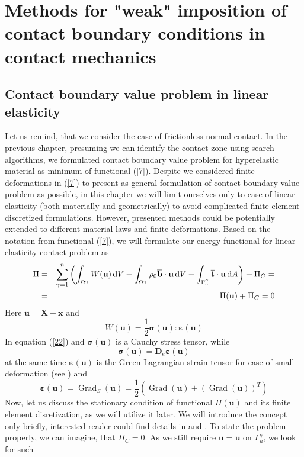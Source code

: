 \documentclass{article}
\newcommand{\beq}{\begin{equation}}
\newcommand{\eeq}{\end{equation}}
\newcommand{\bea}{\begin{eqnarray}}
\newcommand{\eea}{\end{eqnarray}}
\newcommand{\dd}{\,{\rm d}}
\begin{document}
\section{Methods for "weak" imposition of contact boundary conditions in contact mechanics}
\subsection{Contact boundary value problem in linear elasticity}  
Let us remind, that we consider the case of frictionless normal contact. In the previous chapter, presuming we can identify the contact zone using search algorithms, we formulated contact boundary value problem for hyperelastic material as minimum of functional (\ref{7}). Despite we considered finite deformations in (\ref{7}) to present as general formulation of contact boundary value problem as possible, in this chapter we will limit ourselves only to case of linear elasticity (both materially and geometrically) to avoid complicated finite element discretized formulations. However, presented methods could be potentially extended to different material laws and finite deformations. Based on the notation from functional (\ref{7}), we will formulate our energy functional for linear elasticity contact problem as  
\bea\label{21}
\Pi&=&\sum^{n}_{\gamma = 1}\left(\int_{\Omega^{\gamma}} W(\mathbf{u})\dd V-\int_{\Omega^{\gamma}} \rho_{0}\overline{\mathbf{b}} \cdot \mathbf{u} \dd V-\int_{\Gamma_{\sigma}^{\gamma}} \overline{\mathbf{t}} \cdot \mathbf{u} \dd A\right) + \Pi_{C}=
\nonumber
\\
&=&\Pi(\mathbf{u})+ \Pi_{C} = 0
\eea  
Here $ \mathbf{u} = \mathbf{X} - \mathbf{x} $ and
\begin{equation}\label{22}
W(\mathbf{u})=\frac{1}{2} \bm{\sigma(\mathbf{u})} : \bm{\varepsilon(\mathbf{u})}
\end{equation} 
In equation (\ref{22}) and $ \bm{\sigma}(\mathbf{u}) $ is a Cauchy stress tensor, while
\beq\label{23}
\bm{\sigma}(\mathbf{u}) = \mathbf{D}_{e} \bm{\varepsilon}(\mathbf{u})
\eeq 
at the same time $ \bm{\varepsilon}(\mathbf{u}) $ is the Green-Lagrangian strain tensor for case of small deformation (see \cite[Chapter 2, p.24]{Wriggers}) and
\beq\label{24}
\bm{\varepsilon}(\mathbf{u}) = \operatorname{Grad}_{S}(\mathbf{u})=\frac{1}{2}\left(\operatorname{Grad}(\mathbf{u})+(\operatorname{Grad}(\mathbf{u}))^{T} \right) 
\eeq
Now, let us discuss the stationary condition of functional $ \Pi(\mathbf{u}) $ and its finite element disretization, as we will utilize it later. We will introduce the concept only briefly, interested reader could find details in \cite{Zienkiewicz} and \cite{Zienkiewicz2}. To state the problem properly, we can imagine, that $ \Pi_{C} = 0 $. As we still require $ \mathbf{u}=\overline{\mathbf{u}} \text{ on } \Gamma_{u}^{\gamma} $, we look for such 
\end{document}
